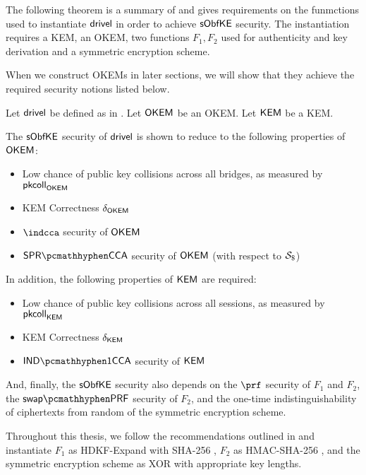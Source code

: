 The following theorem is a summary of \cite[Theorem~5]{EPRINT:GRSV25} and gives requirements on the funmctions used to instantiate $\textsf{drivel}$ in order to achieve $\mathsf{sObfKE}$ security. The instantiation requires a KEM, an OKEM, two functions $F_1, F_2$ used for authenticity and key derivation and a symmetric encryption scheme.

When we construct OKEMs in later sections, we will show that they achieve the required security notions listed below.

\begin{theorem}
\label{thm:drivel-security}
    Let $\textsf{drivel}$ be defined as in \cite[Fig.~6]{EPRINT:GRSV25}. Let $\mathsf{OKEM}$ be an OKEM. Let $\mathsf{KEM}$ be a KEM.
    
    The $\mathsf{sObfKE}$ security of $\textsf{drivel}$ is shown to reduce to the following properties of $\mathsf{OKEM}$:
    \begin{itemize}
        \item Low chance of public key collisions across all bridges, as measured by $\mathsf{pkcoll}_{\mathsf{OKEM}}$
        \item KEM Correctness $\delta_{\mathsf{OKEM}}$
        \item $\indcca$ security of $\mathsf{OKEM}$
        \item $\sprcca$ security of $\mathsf{OKEM}$ (with respect to $\simulbin$)
    \end{itemize}

    In addition, the following properties of $\mathsf{KEM}$ are required:
    \begin{itemize}
        \item Low chance of public key collisions across all sessions, as measured by $\mathsf{pkcoll}_{\mathsf{KEM}}$
        \item KEM Correctness $\delta_{\mathsf{KEM}}$
        \item $\indonecca$ security of $\mathsf{KEM}$
    \end{itemize}

    And, finally, the $\mathsf{sObfKE}$ security also depends on the $\prf$ security of $F_1$ and $F_2$, the $\swapprf$ security of $F_2$, and the one-time indistinguishability of ciphertexts from random of the symmetric encryption scheme.    
\end{theorem}

Throughout this thesis, we follow the recommendations outlined in \cite[Section~4.2]{EPRINT:GRSV25} and instantiate $F_1$ as \textsf{HDKF-Expand} with \textsf{SHA-256} \cite{C:Krawczyk10,rfc5869}, $F_2$ as \textsf{HMAC-SHA-256} \cite{C:BelCanKra96,KraBelCan97}, and the symmetric encryption scheme as XOR with appropriate key lengths.

